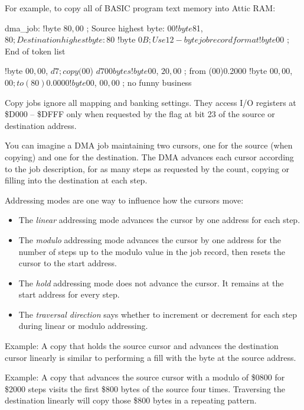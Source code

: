 For example, to copy all of BASIC program text memory into Attic RAM:

\begin{screenoutput}
dma_job:
!byte $80, $00       ; Source highest byte: $00
!byte $81, $80       ; Destination highest byte: $80
!byte $0B            ; Use 12-byte job record format
!byte $00            ; End of token list

!byte $00, $00, $d7  ; copy ($00) $d700 bytes
!byte $00, $20, $00  ; from (00)0.2000
!byte $00, $00, $00  ; to (80)0.0000
!byte $00, $00, $00  ; no funny business
\end{screenoutput}

Copy jobs ignore all mapping and banking settings. They access I/O registers at
\$D000 -- \$DFFF only when requested by the flag at bit 23 of the source or
destination address.

You can imagine a DMA job maintaining two cursors, one for the source (when
copying) and one for the destination. The DMA advances each cursor according to
the job description, for as many steps as requested by the count, copying or
filling into the destination at each step.

Addressing modes are one way to influence how the cursors move:

\begin{itemize}
\item The {\em linear} addressing mode advances the cursor by one address for each
step.
\item The {\em modulo} addressing mode advances the cursor by one address for the
number of steps up to the modulo value in the job record, then resets the
cursor to the start address.
\item The {\em hold} addressing mode does not advance the cursor. It remains at the
start address for every step.
\item The {\em traversal direction} says whether to increment or decrement for each
step during linear or modulo addressing.
\end{itemize}

Example: A copy that holds the source cursor and advances the
destination cursor linearly is similar to performing a fill with the byte at
the source address.

Example: A copy that advances the source cursor with a modulo of \$0800 for
\$2000 steps visits the first \$800 bytes of the source four times. Traversing
the destination linearly will copy those \$800 bytes in a repeating pattern.

